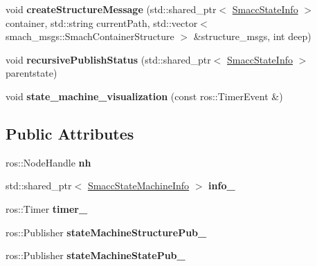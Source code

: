 \begin{DoxyCompactItemize}
void {\bfseries create\+Structure\+Message} (std\+::shared\+\_\+ptr$<$ \hyperlink{classsmacc_1_1SmaccStateInfo}{Smacc\+State\+Info} $>$ container, std\+::string current\+Path, std\+::vector$<$ smach\+\_\+msgs\+::\+Smach\+Container\+Structure $>$ \&structure\+\_\+msgs, int deep)
\item 
\mbox{\label{structsmacc_1_1SmaccStateMachineBase_a5c078ef0eec2c64ecd9a31b46341b13c}} 
void {\bfseries recursive\+Publish\+Status} (std\+::shared\+\_\+ptr$<$ \hyperlink{classsmacc_1_1SmaccStateInfo}{Smacc\+State\+Info} $>$ parentstate)
\item 
\mbox{\label{structsmacc_1_1SmaccStateMachineBase_afcee04fc4d307b31d7d0fac932d7d90f}} 
void {\bfseries state\+\_\+machine\+\_\+visualization} (const ros\+::\+Timer\+Event \&)
\end{DoxyCompactItemize}
\subsection*{Public Attributes}
\begin{DoxyCompactItemize}
\item 
\mbox{\label{structsmacc_1_1SmaccStateMachineBase_a191b29227e32c440c936ac05359e9cd5}} 
ros\+::\+Node\+Handle {\bfseries nh}
\item 
\mbox{\label{structsmacc_1_1SmaccStateMachineBase_a9b28c1933560c98b33444c68c278f8a5}} 
std\+::shared\+\_\+ptr$<$ \hyperlink{classsmacc_1_1SmaccStateMachineInfo}{Smacc\+State\+Machine\+Info} $>$ {\bfseries info\+\_\+}
\item 
\mbox{\label{structsmacc_1_1SmaccStateMachineBase_a7fc7227a0c6321cf7253683a1f38c4f8}} 
ros\+::\+Timer {\bfseries timer\+\_\+}
\item 
\mbox{\label{structsmacc_1_1SmaccStateMachineBase_af586b32d0f79caba26c2dbca76a55767}} 
ros\+::\+Publisher {\bfseries state\+Machine\+Structure\+Pub\+\_\+}
\item 
\mbox{\label{structsmacc_1_1SmaccStateMachineBase_a7c76e7a7d6c00d9831472297ff51e38c}} 
ros\+::\+Publisher {\bfseries state\+Machine\+State\+Pub\+\_\+}
\end{DoxyCompactItemize}



